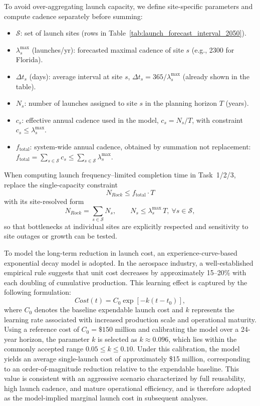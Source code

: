 ﻿\documentclass{mcmthesis}
\begin{document}
To avoid over-aggregating launch capacity, we define site-specific parameters and compute cadence separately before summing:
\begin{itemize}
    \item $\mathcal{S}$: set of launch sites (rows in Table~\ref{tab:launch_forecast_interval_2050}).
    \item $\lambda_s^{\text{max}}$ (launches/yr): forecasted maximal cadence of site $s$ (e.g., 2300 for Florida).
    \item $\Delta t_s$ (days): average interval at site $s$, $\Delta t_s = 365/\lambda_s^{\text{max}}$ (already shown in the table).
    \item $N_s$: number of launches assigned to site $s$ in the planning horizon $T$ (years).
    \item $c_s$: effective annual cadence used in the model, $c_s = N_s/T$, with constraint $c_s \le \lambda_s^{\text{max}}$.
    \item $f_{\text{total}}$: system-wide annual cadence, obtained by summation not replacement: $f_{\text{total}} = \sum_{s\in\mathcal{S}} c_s \le \sum_{s\in\mathcal{S}} \lambda_s^{\text{max}}$.
\end{itemize}

When computing launch frequency–limited completion time in Task~1/2/3, replace the single-capacity constraint
\[
N_{Rock} \le f_{\text{total}}\cdot T
\]
with its site-resolved form
\[
N_{Rock} = \sum_{s\in\mathcal{S}} N_s,\qquad N_s \le \lambda_s^{\text{max}}\,T,\ \forall s\in\mathcal{S},
\]
so that bottlenecks at individual sites are explicitly respected and sensitivity to site outages or growth can be tested.



To model the long-term reduction in launch cost, an experience-curve-based exponential decay model is adopted. In the aerospace industry, a well-established empirical rule suggests that unit cost decreases by approximately 15--20\% with each doubling of cumulative production. This learning effect is captured by the following formulation:
\begin{equation}
Cost(t) = C_{0}\exp\left[-k(t-t_{0})\right],
\end{equation}
where $C_{0}$ denotes the baseline expendable launch cost and $k$ represents the learning rate associated with increased production scale and operational maturity. Using a reference cost of $C_{0}=\$150$ million and calibrating the model over a 24-year horizon, the parameter $k$ is selected as $k\approx0.096$, which lies within the commonly accepted range $0.05 \le k \le 0.10$. Under this calibration, the model yields an average single-launch cost of approximately \$15 million, corresponding to an order-of-magnitude reduction relative to the expendable baseline. This value is consistent with an aggressive scenario characterized by full reusability, high launch cadence, and mature operational efficiency, and is therefore adopted as the model-implied marginal launch cost in subsequent analyses.
\end{document}
